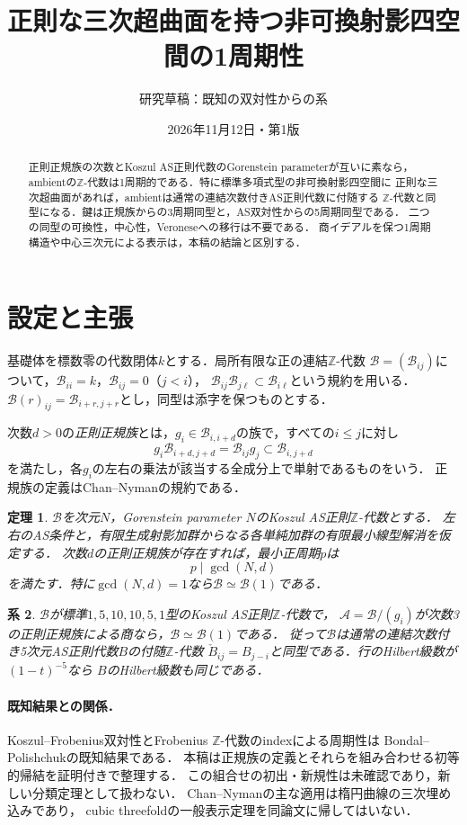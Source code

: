 \documentclass[10pt,a4paper]{ltjsarticle}
\title{正則な三次超曲面を持つ非可換射影四空間の1周期性}
\author{研究草稿：既知の双対性からの系}
\date{2026年11月12日・第1版}
\newtheorem{theorem}{定理}[section]
\newtheorem{corollary}[theorem]{系}
\newcommand{\Z}{\mathbb Z}
\newcommand{\cB}{\mathcal B}
\newcommand{\cA}{\mathcal A}
\begin{document}
\maketitle
\begin{abstract}
正則正規族の次数とKoszul AS正則代数のGorenstein parameterが互いに素なら，
ambientの$\Z$-代数は1周期的である．特に標準多項式型の非可換射影四空間に
正則な三次超曲面があれば，ambientは通常の連結次数付きAS正則代数に付随する
$\Z$-代数と同型になる．鍵は正規族からの3周期同型と，AS双対性からの5周期同型である．
二つの同型の可換性，中心性，Veroneseへの移行は不要である．
商イデアルを保つ1周期構造や中心三次元による表示は，本稿の結論と区別する．
\end{abstract}

\section{設定と主張}
基礎体を標数零の代数閉体$k$とする．局所有限な正の連結$\Z$-代数
$\cB=(\cB_{ij})$について，$\cB_{ii}=k$，$\cB_{ij}=0$（$j<i$），
$\cB_{ij}\cB_{j\ell}\subset\cB_{i\ell}$という規約を用いる．
$\cB(r)_{ij}=\cB_{i+r,j+r}$とし，同型は添字を保つものとする．

次数$d>0$の\emph{正則正規族}とは，$g_i\in\cB_{i,i+d}$の族で，すべての$i\le j$に対し
\begin{equation}\label{eq:normal}
 g_i\cB_{i+d,j+d}=\cB_{ij}g_j\subset\cB_{i,j+d}
\end{equation}
を満たし，各$g_i$の左右の乗法が該当する全成分上で単射であるものをいう．
正規族の定義はChan--Nyman\cite[Definition 8.6]{CN}の規約である．

\begin{theorem}\label{thm:gcd}
$\cB$を次元$N$，Gorenstein parameter $N$のKoszul AS正則$\Z$-代数とする．
左右のAS条件と，有限生成射影加群からなる各単純加群の有限最小線型解消を仮定する．
次数$d$の正則正規族が存在すれば，最小正周期$p$は
\[
 p\mid\gcd(N,d)
\]
を満たす．特に$\gcd(N,d)=1$なら$\cB\simeq\cB(1)$である．
\end{theorem}

\begin{corollary}\label{cor:cubic}
$\cB$が標準$1,5,10,10,5,1$型のKoszul AS正則$\Z$-代数で，
$\cA=\cB/(g_i)$が次数3の正則正規族による商なら，$\cB\simeq\cB(1)$である．
従って$\cB$は通常の連結次数付き5次元AS正則代数$B$の付随$\Z$-代数
$\check B_{ij}=B_{j-i}$と同型である．行のHilbert級数が$(1-t)^{-5}$なら
$B$のHilbert級数も同じである．
\end{corollary}

\paragraph{既知結果との関係．}
Koszul--Frobenius双対性とFrobenius $\Z$-代数のindexによる周期性は
Bondal--Polishchuk\cite[Proposition 4.1, \S5]{BP}の既知結果である．
本稿は正規族の定義とそれらを組み合わせる初等的帰結を証明付きで整理する．
この組合せの初出・新規性は未確認であり，新しい分類定理として扱わない．
Chan--Nymanの主な適用は楕円曲線の三次埋め込みであり，
cubic threefoldの一般表示定理を同論文に帰してはいない．
\end{document}
